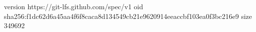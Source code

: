 version https://git-lfs.github.com/spec/v1
oid sha256:f1dc62d6a45aa4f6f8caca8d134549cb21e9620914eeaccbf103ea0f3bc216e9
size 349692
